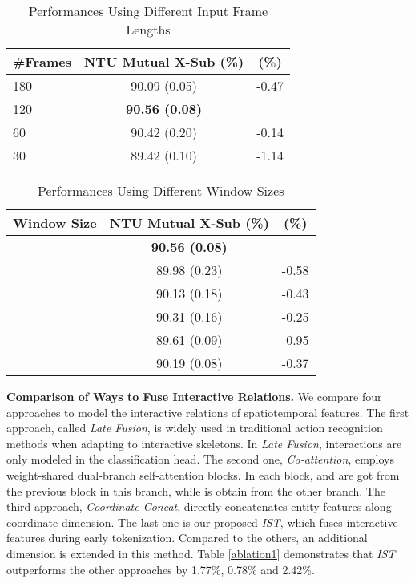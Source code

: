 \documentclass[letterpaper, 10 pt, conference]{ieeeconf}
\begin{document}
\begin{table}[t]
	\centering
	\caption{Performances Using Different Input Frame Lengths}
	\vspace{-0.7em}
	\label{ablation4}
\begin{tabular}{l|c|c}
            \hline
               \#Frames & NTU Mutual X-Sub (\%) &  (\%)\\
		\hline
                180 & 90.09 (0.05) & -0.47\\
                120 & \textbf{90.56 (0.08)} & - \\
                60 & 90.42 (0.20) & -0.14\\
                30 & 89.42 (0.10) & -1.14\\
            \hline
	\end{tabular}
\vspace{-1.0em}
\end{table}

\begin{table}[t]
	\centering
	\caption{Performances Using Different Window Sizes}
	\vspace{-0.7em}
	\label{ablation5}
\begin{tabular}{l|c|c}
            \hline
               Window Size & NTU Mutual X-Sub (\%) &  (\%)\\
		\hline
                 & \textbf{90.56 (0.08)} & - \\
            \hline
                 & 89.98 (0.23)& -0.58\\
                 & 90.13 (0.18)& -0.43\\
            \hline
                 & 90.31 (0.16)& -0.25\\
                 & 89.61 (0.09)& -0.95\\
            \hline
                 & 90.19 (0.08)& -0.37\\
            \hline
	\end{tabular}
\vspace{-1.0em}
\end{table}


\textbf{Comparison of Ways to Fuse Interactive Relations.} We compare four approaches to model the interactive relations of spatiotemporal features. The first approach, called \textit{Late Fusion}, is widely used in traditional action recognition methods when adapting to interactive skeletons. In \textit{Late Fusion}, interactions are only modeled in the classification head. The second one, \textit{Co-attention}, employs weight-shared dual-branch self-attention blocks. In each block,  and  are got from the previous block in this branch, while  is obtain from the other branch. The third approach, \textit{Coordinate Concat}, directly concatenates entity features along coordinate dimension. The last one is our proposed \textit{IST}, which fuses interactive features during early tokenization. Compared to the others, an additional dimension  is extended in this method. Table \ref{ablation1} demonstrates that \textit{IST} outperforms the other approaches by 1.77\%, 0.78\% and 2.42\%.
\end{document}
